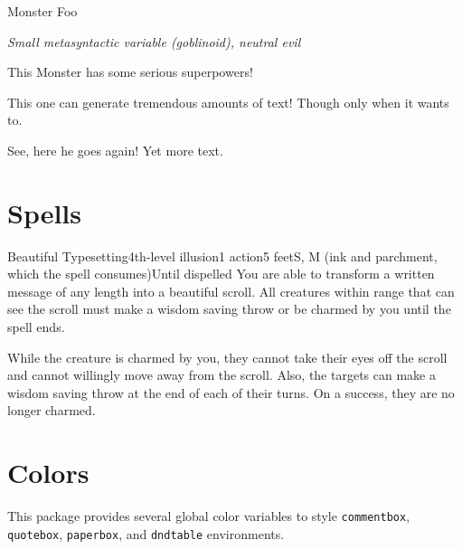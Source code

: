 \documentclass[letterpaper,10pt,twoside,twocolumn,openany]{book}
\begin{document}
\begin{monsterbox}{Monster Foo}
\begin{hangingpar}
\textit{Small metasyntactic variable (goblinoid), neutral evil}
\end{hangingpar}
\hline%
\basics[%
armorclass = 12,
hitpoints = \dice{3d8+3},
speed = 50 ft,
]
\hline%
\stats[%
CON = \stat{10},
STR = \stat{12},
DEX = \stat{7},
INT = \stat{10},
WIS = \stat{10},
CHA = \stat{10},
]
\hline%
\details[%
languages = {Common Lisp, Erlang},
challenge = 0,
]
\hline [1mm]
\begin{monsteraction}
This Monster has some serious superpowers!
\end{monsteraction}
\begin{monsteraction}
This one can generate tremendous amounts of text!
Though only when it wants to.
\end{monsteraction}
\begin{monsteraction}
See, here he goes again! Yet more text.
\end{monsteraction}
\end{monsterbox}

\section{Spells}
\label{sec:org7f5158a}

\begin{spell}{Beautiful Typesetting}{4th-level illusion}{1 action}{5 feet}{S, M (ink and parchment, which the spell consumes)}{Until dispelled}
You are able to transform a written message of any length into a beautiful
scroll. All creatures within range that can see the scroll must make a wisdom
saving throw or be charmed by you until the spell ends.

While the creature is charmed by you, they cannot take their eyes off the
scroll and cannot willingly move away from the scroll. Also, the targets can
make a wisdom saving throw at the end of each of their turns. On a success,
they are no longer charmed.
\end{spell}

\lipsum[2]

\section{Colors}
\label{sec:org436b61c}

This package provides several global color variables to style \texttt{commentbox}, \texttt{quotebox}, \texttt{paperbox}, and \texttt{dndtable} environments.
\end{document}
